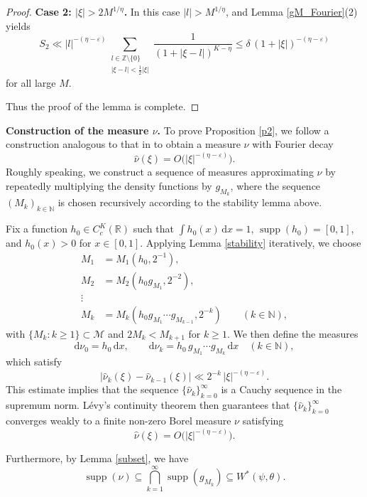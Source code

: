 \documentclass[12pt,a4paper,twoside]{article}
\begin{document}
\begin{proof}
\medskip

\noindent\textbf{Case 2: $|\xi| > 2M^{1/\eta}$.}
In this case $|l| > M^{1/\eta}$, and Lemma \ref{gM_Fourier}(2) yields
\[
S_2 \ll |l|^{-(\eta - \varepsilon)} \sum_{\substack{l \in \mathbb{Z}\setminus\{0\} \\ |\xi - l| < \frac{1}{2}|\xi|}} \frac{1}{(1 + |\xi - l|)^{K - \eta}}
\le \delta \, (1 + |\xi|)^{-(\eta - \varepsilon)}
\]
for all large $M$.

Thus the proof of the lemma is complete.
\end{proof}


\noindent\textbf{Construction of the measure $\nu$.}
To prove Proposition \ref{p2}, we follow a construction analogous to that in \cite{B98} to obtain a measure \(\nu\) with Fourier decay
\[
\widehat{\nu}(\xi) = O\bigl(|\xi|^{-(\eta - \varepsilon)}\bigr).
\]
Roughly speaking, we construct a sequence of measures approximating \(\nu\) by repeatedly multiplying the density functions by \(g_{M_k}\), where the sequence \((M_k)_{k \in \mathbb{N}}\) is chosen recursively according to the stability lemma above.


\medskip
Fix a function \(h_0 \in C_c^{K}(\mathbb{R})\) such that \(\int h_0(x) \, \mathrm{d}x = 1\), \(\operatorname{supp}(h_0) = [0,1]\), and \(h_0(x) > 0\) for \(x \in [0,1]\).
Applying Lemma \ref{stability} iteratively, we choose
\begin{align*}
M_1 &= M_1(h_0, 2^{-1}),\\
M_2 &= M_2(h_0 g_{M_1}, 2^{-2}),\\
\vdots\\
M_k &= M_k(h_0 g_{M_1} \cdots g_{M_{k-1}}, 2^{-k}) \qquad (k \in \mathbb{N}),
\end{align*}
with \(\{M_k : k \ge 1\} \subset \mathcal{M}\) and \(2M_k < M_{k+1}\) for \(k \ge 1\). We then define the measures
\[
\mathrm{d}\nu_0 = h_0 \, \mathrm{d}x, \qquad
\mathrm{d}\nu_k = h_0 \, g_{M_1} \cdots g_{M_k} \, \mathrm{d}x \quad (k \in \mathbb{N}),
\]
which satisfy
\[
\bigl| \widehat{\nu}_k(\xi) - \widehat{\nu}_{k-1}(\xi) \bigr| \ll 2^{-k} \, |\xi|^{-(\eta - \varepsilon)}.
\]
This estimate implies that the sequence \(\{\widehat{\nu}_k\}_{k=0}^{\infty}\) is a  Cauchy sequence  in the supremum norm.
L\'evy's continuity theorem \cite[Theorem 3.3.17]{D19} then guarantees that \(\{\widehat{\nu}_k\}_{k=0}^{\infty}\) converges weakly to a finite non-zero Borel measure \(\nu\) satisfying
\[
\widehat{\nu}(\xi) = O\bigl(|\xi|^{-(\eta - \varepsilon)}\bigr).
\]

Furthermore, by Lemma \ref{subset}, we have
\[
\operatorname{supp}(\nu) \subseteq \bigcap_{k=1}^{\infty} \operatorname{supp}(g_{M_k}) \subseteq W^{\ast}(\psi,\theta).
\]
\end{document}
